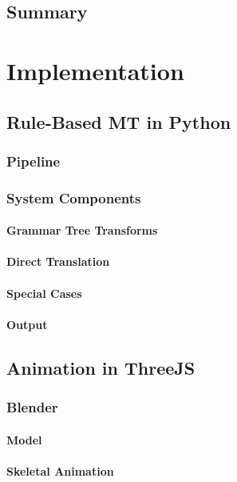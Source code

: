 \documentclass[12pt]{ociamthesis}  %
\begin{document}
\section{Summary}


\chapter{Implementation}

\section{Rule-Based MT in Python}
	\subsection{Pipeline}
	\subsection{System Components}
		\subsubsection{Grammar Tree Transforms}
		\subsubsection{Direct Translation}
		\subsubsection{Special Cases}
		\subsubsection{Output}
	
\section{Animation in ThreeJS}
	\subsection{Blender}
		\subsubsection{Model}
		\subsubsection{Skeletal Animation}
\end{document}
